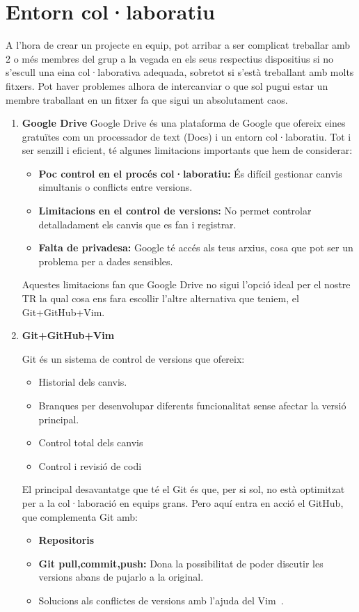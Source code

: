 \section{Entorn col·laboratiu}\label{sec:4.3}
A l'hora de crear un projecte en equip, pot arribar a ser complicat treballar amb 2 o més membres del grup a la vegada en els seus respectius dispositius si no s'escull una eina col·laborativa adequada, sobretot si s'està treballant amb molts fitxers. Pot haver problemes alhora de intercanviar o que sol pugui estar un membre traballant en un fitxer fa que sigui un absolutament caos.
\begin{enumerate}
 \item \textbf{Google Drive}
 Google Drive és una plataforma de Google que ofereix eines gratuïtes com un processador de text (Docs) i un entorn col·laboratiu. Tot i ser senzill i eficient, té algunes limitacions importants que hem de considerar:
\begin{itemize}
 \item \textbf{Poc control en el procés col·laboratiu:} És difícil gestionar canvis simultanis o conflicts entre versions.
 \item \textbf{Limitacions en el control de versions:} No permet controlar detalladament els canvis que es fan i registrar.
 \item \textbf{Falta de privadesa:} Google té accés als teus arxius, cosa que pot ser un problema per a dades sensibles.
\end{itemize}
Aquestes limitacions fan que Google Drive no sigui l'opció ideal per el nostre TR la qual cosa ens fara escollir l'altre alternativa que teniem, el Git+GitHub+Vim.

\item \textbf{Git+GitHub+Vim}

Git és un sistema de control de versions que ofereix:
\begin{itemize}
 \item Historial dels canvis.
 \item Branques per desenvolupar diferents funcionalitat sense afectar la versió principal.
 \item Control total dels canvis
 \item Control i revisió de codi
\end{itemize}
El principal desavantatge que té el Git és que, per si sol, no està optimitzat per a la col·laboració en equips grans. Pero aquí entra en acció el GitHub, que complementa Git amb:
\begin{itemize}
\item \textbf{Repositoris}
 \item \textbf{Git pull,commit,push:} Dona la possibilitat de poder discutir les versions abans de pujarlo a la original.
 \item Solucions als conflictes de versions amb l'ajuda del Vim~\cite{Vim}.
 \end{itemize}


\end{enumerate}
